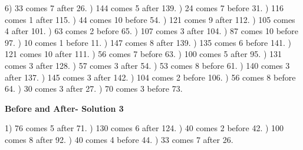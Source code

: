 \documentclass{article}%
\begin{document}
6) 33 comes 7 after 26.%
) 144 comes 5 after 139.%
) 24 comes 7 before 31.%
) 116 comes 1 after 115.%
) 44 comes 10 before 54.%
) 121 comes 9 after 112.%
) 105 comes 4 after 101.%
) 63 comes 2 before 65.%
) 107 comes 3 after 104.%
) 87 comes 10 before 97.%
) 10 comes 1 before 11.%
) 147 comes 8 after 139.%
) 135 comes 6 before 141.%
) 121 comes 10 after 111.%
) 56 comes 7 before 63.%
) 100 comes 5 after 95.%
) 131 comes 3 after 128.%
) 57 comes 3 after 54.%
) 53 comes 8 before 61.%
) 140 comes 3 after 137.%
) 145 comes 3 after 142.%
) 104 comes 2 before 106.%
) 56 comes 8 before 64.%
) 30 comes 3 after 27.%
) 70 comes 3 before 73.%
\newline%
\newpage%
\large%
\begin{center}%
\textbf{Before and After- Solution 3}%
\newline%
\end{center} \normalsize%
1) 76 comes 5 after 71.%
) 130 comes 6 after 124.%
) 40 comes 2 before 42.%
) 100 comes 8 after 92.%
) 40 comes 4 before 44.%
) 33 comes 7 after 26.%
\newline%
\end{document}
